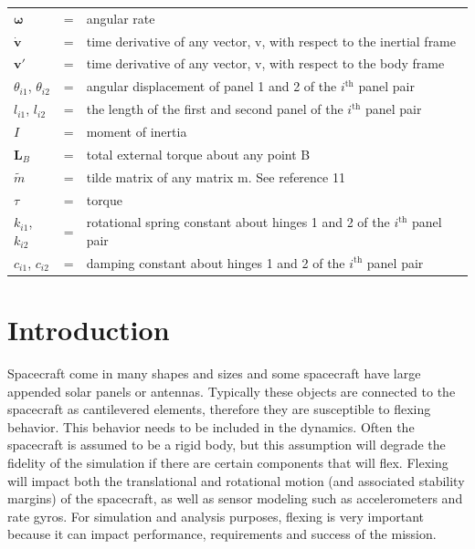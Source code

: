 \documentclass[paper]{aiaaNew}
\begin{document}
\begin{tabular}{@{}lcl@{}}
		$\bm \omega $ &=& angular rate \\
		$\dot{\bm{v}}$ &=& time derivative of any vector, v, with respect to the inertial frame \\
		$\bm{v}'$ &=& time derivative of any vector, v, with respect to the body frame \\
		$\theta_{i1}$, $\theta_{i2}$ &=& angular displacement of panel 1 and 2 of the $i^\text{th}$ panel pair \\
		$l_{i1}$, $l_{i2}$ &=& the length of the first and second panel of the $i^\text{th}$ panel pair \\
		$I$ &=& moment of inertia \\
		$\bm L_B$ &=& total external torque about any point B \\
		$\tilde{m}$ &=& tilde matrix of any matrix m. See reference 11 \\
	    $\tau$ &=& torque \\
	    $k_{i1}$, $k_{i2}$ &=& rotational spring constant about hinges 1 and 2 of the $i^\text{th}$ panel pair \\
	    $c_{i1}$, $c_{i2}$ &=& damping constant about hinges 1 and 2 of the $i^\text{th}$ panel pair \\  
		
\end{tabular} 
	
	\section{Introduction}
	Spacecraft come in many shapes and sizes and some spacecraft have large appended solar panels or antennas. Typically these objects are connected to the spacecraft as cantilevered elements, therefore they are susceptible to flexing behavior. This behavior needs to be included in the dynamics. Often the spacecraft is assumed to be a rigid body, but this assumption will degrade the fidelity of the simulation if there are certain components that will flex. Flexing will impact both the translational and rotational motion (and associated stability margins) of the spacecraft, as well as sensor modeling such as accelerometers and rate gyros. For simulation and analysis purposes, flexing is very important because it can impact performance, requirements and success of the mission.
\end{document}

